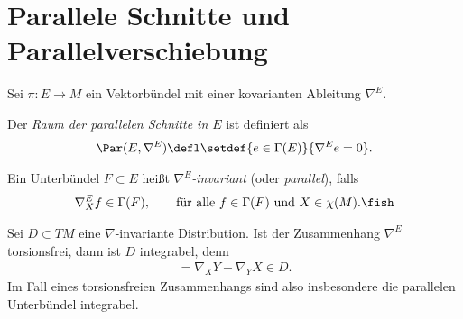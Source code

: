 \documentclass[%
	paper=a5,%
	fleqn,%
	DIV=18,%
	BCOR=0mm,
	fontsize=11pt,
	titlepage=false,%
	bibliography=totoc,
	DIV=18,%
	twoside=true,
	pdftitle=Riemannsche Geometrie,
	pdfauthor=Uwe Semmelmann,
	numbers=noendperiod]%
	{scrbook}
\begin{document}
\section{Parallele Schnitte und Parallelverschiebung}

Sei $\pi: E\to M$ ein Vektorbündel mit einer kovarianten Ableitung $\nabla^E$.

\begin{defn}
\begin{defnenum}
\item
Der \emph{Raum der parallelen Schnitte in $E$} ist definiert als
\begin{align*}
\Par(E,\nabla^E) \defl \setdef{e\in \Gamma(E)}{\nabla^E e = 0}.
\end{align*}
\item Ein Unterbündel $F\subset E$ heißt \emph{$\nabla^E$-invariant} (oder
\emph{parallel}), falls
\begin{align*}
\nabla_X^E f \in \Gamma(F),\qquad \text{für alle }f\in \Gamma(F)\text{ und }
X\in\chi(M).\fish
\end{align*}
\end{defnenum}
\end{defn}

\begin{rem}
Sei $D\subset TM$ eine $\nabla$-invariante Distribution. Ist der Zusammenhang
$\nabla^E$ torsionsfrei, dann ist $D$ integrabel, denn
\begin{align*}
[X,Y] = \nabla_X Y - \nabla_Y X \in D.
\end{align*}
Im Fall eines torsionsfreien Zusammenhangs sind also insbesondere die parallelen Unterbündel integrabel.\map
\end{rem}
\end{document}
